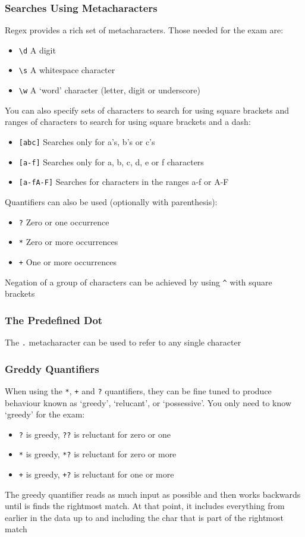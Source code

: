 \subsubsection{Searches Using Metacharacters}
Regex provides a rich set of metacharacters. Those needed for the exam are:
\begin{itemize}
    \item \verb#\d# A digit
    \item \verb#\s# A whitespace character
    \item \verb#\w# A `word' character (letter, digit or underscore)
\end{itemize}
You can also specify sets of characters to search for using square brackets and 
ranges of characters to search for using square brackets and a dash:
\begin{itemize}
    \item \verb#[abc]# Searches only for a's, b's or c's
    \item \verb#[a-f]# Searches only for a, b, c, d, e or f characters
    \item \verb#[a-fA-F]# Searches for characters in the ranges a-f or A-F
\end{itemize}
Quantifiers can also be used (optionally with parenthesis):
\begin{itemize}
    \item \verb#?# Zero or one occurrence
    \item \verb#*# Zero or more occurrences
    \item \verb#+# One or more occurrences
\end{itemize}
Negation of a group of characters can be achieved by using \verb#^# with square 
brackets

\subsubsection{The Predefined Dot}
The \verb#.# metacharacter can be used to refer to any single character

\subsubsection{Greddy Quantifiers}
When using the \verb#*#, \verb#+# and \verb#?# quantifiers, they can be fine 
tuned to produce behaviour known as `greedy', `relucant', or `possessive'. You 
only need to know `greedy' for the exam:
\begin{itemize}
    \item \verb#?# is greedy, \verb#??# is reluctant for zero or one
    \item \verb#*# is greedy, \verb#*?# is reluctant for zero or more
    \item \verb#+# is greedy, \verb#+?# is reluctant for one or more
\end{itemize}
The greedy quantifier reads as much input as possible and then works backwards 
until is finds the rightmost match. At that point, it includes everything from 
earlier in the data up to and including the char that is part of the rightmost 
match

